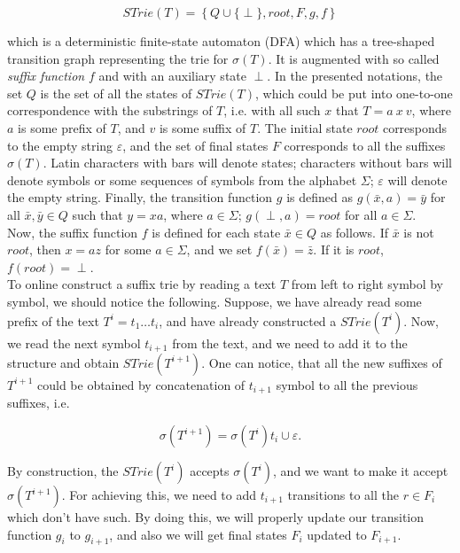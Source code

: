 \documentclass[paper=a4, fontsize=11pt]{scrartcl} %
\numberwithin{equation}{section} %
\numberwithin{figure}{section} %
\numberwithin{table}{section} %
\begin{document}
\begin{equation}
STrie(T) = \left\{Q \cup \{\perp\}, root, F, g, f \right\}
\end{equation}

which is a deterministic finite-state automaton (DFA) which has a tree-shaped transition graph representing the trie for $\sigma(T)$. It is augmented with so called \textit{suffix function} $f$ and with an auxiliary state $\perp$. In the presented notations, the set $Q$ is the set of all the states of $STrie(T)$, which could be put into one-to-one correspondence with the substrings of $T$, i.e. with all such $x$ that $T = a\ x\ v$, where $a$ is some prefix of $T$, and $v$ is some suffix of $T$. The initial state $root$ corresponds to the empty string $\varepsilon$, and the set of final states $F$ corresponds to all the suffixes $\sigma(T)$. Latin characters with bars will denote states; characters without bars will denote symbols or some sequences of symbols from the alphabet $\Sigma$; $\varepsilon$ will denote the empty string. Finally, the transition function $g$ is defined as $g(\bar{x}, a) = \bar{y}$ for all $\bar{x}, \bar{y} \in Q$ such that $y = xa$, where $a \in \Sigma$; $g(\perp, a) = root$ for all $a \in \Sigma$.\\

Now, the suffix function $f$ is defined for each state $\bar{x} \in Q$ as follows. If $\bar{x}$ is not $root$, then $x = az$ for some $a \in \Sigma$, and we set $f(\bar{x}) = \bar{z}$. If it is $root$, $f(root) = \perp$.\\

To online construct a suffix trie by reading a text $T$ from left to right symbol by symbol, we should notice the following. Suppose, we have already read some prefix of the text $T^i = t_1 \dots t_i$, and have already constructed a $STrie(T^i)$. Now, we read the next symbol $t_{i+1}$ from the text, and we need to add it to the structure and obtain $STrie(T^{i+1})$. One can notice, that all the new suffixes of $T^{i+1}$ could be obtained by concatenation of $t_{i+1}$ symbol to all the previous suffixes, i.e.

$$
\sigma(T^{i+1}) = \sigma(T^i)t_i \cup \varepsilon.
$$

By construction, the $STrie(T^i)$ accepts $\sigma(T^i)$, and we want to make it accept $\sigma(T^{i+1})$. For achieving this, we need to add $t_{i+1}$ transitions to all the $r \in F_i$ which don't have such. By doing this, we will properly update our transition function $g_i$ to $g_{i+1}$, and also we will get final states $F_i$ updated to $F_{i+1}$.\\
\end{document}
